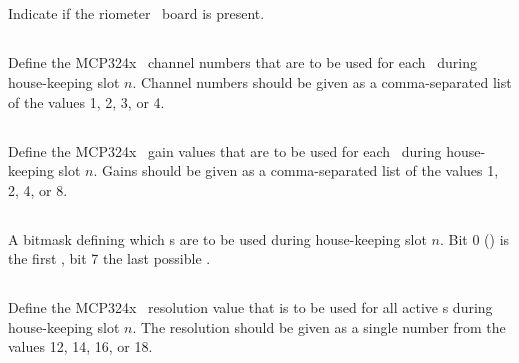 \subsection[rio-present]{}
Indicate if the riometer \adc\ board is present.

\subsection[rio-housekeeping-n-adc-channel-list]{}
Define the MCP324x \adc\ channel numbers that are to be used for each
\adc\ during house-keeping slot $n$. Channel numbers should be given
as a comma-separated list of the values 1, 2, 3, or 4.

\subsection[rio-housekeeping-n-adc-gain-list]{}
Define the MCP324x \adc\ gain values that are to be used for each
\adc\ during house-keeping slot $n$. Gains should be given as a
comma-separated list of the values 1, 2, 4, or 8.

\subsection[rio-housekeeping-n-adc-mask]{}
A bitmask defining which \adc s are to be used during house-keeping
slot $n$. Bit 0 (\lsb) is the first \adc, bit 7 the last possible
\adc.

\subsection[rio-housekeeping-n-adc-resolution]{}
Define the MCP324x \adc\ resolution value that is to be used for all
active \adc s during house-keeping slot $n$. The resolution should be
given as a single number from the values 12, 14, 16, or 18.


\subsection[rio-housekeeping-n-num-samples]{}

